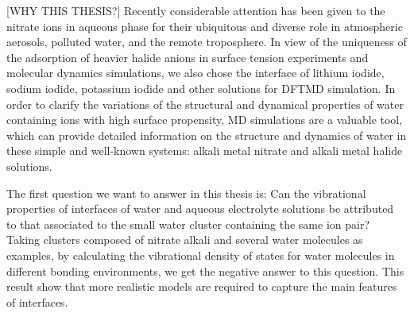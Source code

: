 [WHY THIS THESIS?]
Recently considerable attention has been given to the nitrate ions in aqueous phase 
for their ubiquitous and diverse role in atmospheric aerosols, polluted water, 
and the remote troposphere\cite{XuM2009,Jubb2012}.
In view of the uniqueness of the adsorption of heavier halide anions in surface tension experiments and molecular dynamics simulations, 
we also chose the interface of lithium iodide, sodium iodide, potassium iodide and other solutions for DFTMD simulation.
In order to clarify the variations of the structural and dynamical properties 
of water containing ions with high surface propensity, MD simulations are a valuable tool, 
which can provide detailed information on the structure and dynamics  
of water in these simple and well-known systems: alkali metal nitrate and alkali metal halide solutions\cite{KM98}.

The first question we want to answer in this thesis is: 
Can the vibrational properties of interfaces of water and aqueous electrolyte solutions be attributed to 
that associated to the small water cluster containing the same ion pair?　
Taking clusters composed of nitrate alkali and several water molecules as examples, by calculating the vibrational density of states 
for water molecules in different bonding environments, we get the negative answer to this question. 
This result show that more realistic models are required to capture the main features of interfaces.

